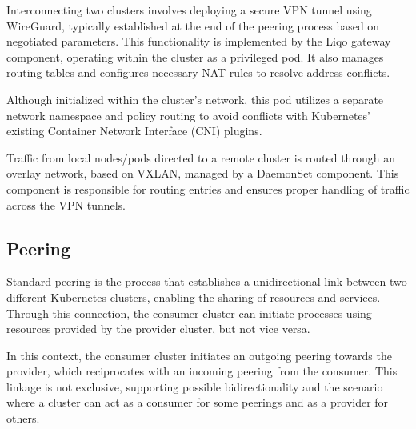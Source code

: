 Interconnecting two clusters involves deploying a secure VPN tunnel using WireGuard, typically established at the end of the peering process based on negotiated parameters. This functionality is implemented by the Liqo gateway component, operating within the cluster as a privileged pod. It also manages routing tables and configures necessary NAT rules to resolve address conflicts. 

Although initialized within the cluster's network, this pod utilizes a separate network namespace and policy routing to avoid conflicts with Kubernetes' existing Container Network Interface (CNI) plugins.

Traffic from local nodes/pods directed to a remote cluster is routed through an overlay network, based on VXLAN, managed by a DaemonSet component. This component is responsible for routing entries and ensures proper handling of traffic across the VPN tunnels.

\subsection{Peering}
Standard peering is the process that establishes a unidirectional link between two different Kubernetes clusters, enabling the sharing of resources and services. Through this connection, the consumer cluster can initiate processes using resources provided by the provider cluster, but not vice versa. 

In this context, the consumer cluster initiates an outgoing peering towards the provider, which reciprocates with an incoming peering from the consumer. This linkage is not exclusive, supporting possible bidirectionality and the scenario where a cluster can act as a consumer for some peerings and as a provider for others.

